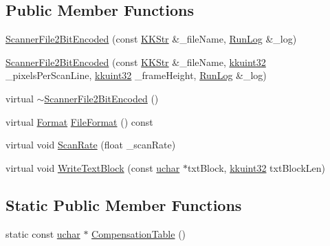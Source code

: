 \subsection*{Public Member Functions}
\begin{DoxyCompactItemize}
\item 
\hyperlink{class_k_k_l_s_c_1_1_scanner_file2_bit_encoded_aeb7744cca4f626dad7950ff0da82f8d2}{Scanner\+File2\+Bit\+Encoded} (const \hyperlink{class_k_k_b_1_1_k_k_str}{K\+K\+Str} \&\+\_\+file\+Name, \hyperlink{class_k_k_b_1_1_run_log}{Run\+Log} \&\+\_\+log)
\item 
\hyperlink{class_k_k_l_s_c_1_1_scanner_file2_bit_encoded_a8d1bbf13db27590dcfe4cf968439084d}{Scanner\+File2\+Bit\+Encoded} (const \hyperlink{class_k_k_b_1_1_k_k_str}{K\+K\+Str} \&\+\_\+file\+Name, \hyperlink{namespace_k_k_b_af8d832f05c54994a1cce25bd5743e19a}{kkuint32} \+\_\+pixels\+Per\+Scan\+Line, \hyperlink{namespace_k_k_b_af8d832f05c54994a1cce25bd5743e19a}{kkuint32} \+\_\+frame\+Height, \hyperlink{class_k_k_b_1_1_run_log}{Run\+Log} \&\+\_\+log)
\item 
virtual \hyperlink{class_k_k_l_s_c_1_1_scanner_file2_bit_encoded_af801f5037bc9330823c595c52cddfde4}{$\sim$\+Scanner\+File2\+Bit\+Encoded} ()
\item 
virtual \hyperlink{class_k_k_l_s_c_1_1_scanner_file_a9eb976c9d084a94db71a5e8d1fadb903}{Format} \hyperlink{class_k_k_l_s_c_1_1_scanner_file2_bit_encoded_a31b2528cb29f384bc15a92e6a7fb2916}{File\+Format} () const 
\item 
virtual void \hyperlink{class_k_k_l_s_c_1_1_scanner_file2_bit_encoded_a447bedabb0c6c8e7752a0a230a8f10a6}{Scan\+Rate} (float \+\_\+scan\+Rate)
\item 
virtual void \hyperlink{class_k_k_l_s_c_1_1_scanner_file2_bit_encoded_acf0a8b70e2605d514d4776f41aaa8344}{Write\+Text\+Block} (const \hyperlink{namespace_k_k_b_ace9969169bf514f9ee6185186949cdf7}{uchar} $\ast$txt\+Block, \hyperlink{namespace_k_k_b_af8d832f05c54994a1cce25bd5743e19a}{kkuint32} txt\+Block\+Len)
\end{DoxyCompactItemize}
\subsection*{Static Public Member Functions}
\begin{DoxyCompactItemize}
\item 
static const \hyperlink{namespace_k_k_b_ace9969169bf514f9ee6185186949cdf7}{uchar} $\ast$ \hyperlink{class_k_k_l_s_c_1_1_scanner_file2_bit_encoded_a83ff6c2d28f8e6e8cdc673394f649805}{Compensation\+Table} ()
\end{DoxyCompactItemize}
